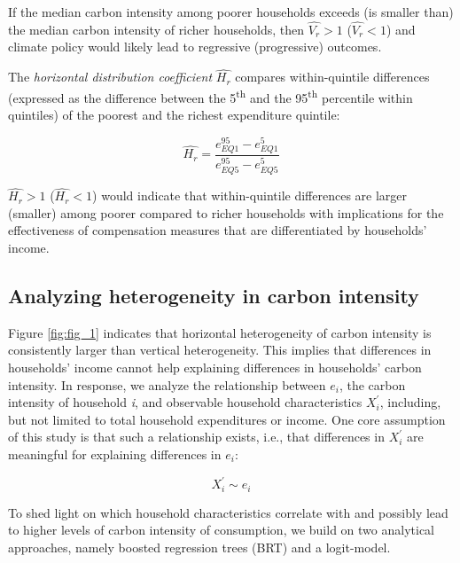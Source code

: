 \documentclass[12pt, a4paper]{article}
\begin{document}
If the median carbon intensity among poorer households exceeds (is smaller than) the median carbon intensity of richer households, then $\widehat{V_{r}}>1$ ($\widehat{V_{r}}<1$) and climate policy would likely lead to regressive (progressive) outcomes.

The \textit{horizontal distribution coefficient} $\widehat{H_{r}}$ compares within-quintile differences (expressed as the difference between the 5\textsuperscript{th} and the 95\textsuperscript{th} percentile within quintiles) of the poorest and the richest expenditure quintile:

\begin{equation}
    \widehat{H_{r}} = \frac{e_{EQ1}^{95} - e_{EQ1}^{5}}{e_{EQ5}^{95} - e_{EQ5}^{5}}
\end{equation}

$\widehat{H_{r}}>1$ ($\widehat{H_{r}}<1$) would indicate that within-quintile differences are larger (smaller) among poorer compared to richer households with implications for the effectiveness of compensation measures that are differentiated by households' income.

\subsection{Analyzing heterogeneity in carbon intensity} \label{sec:methods}

Figure \ref{fig:fig_1} indicates that horizontal heterogeneity of carbon intensity is consistently larger than vertical heterogeneity. This implies that differences in households' income cannot help explaining differences in households' carbon intensity. In response, we analyze the relationship between $e_{i}$, the carbon intensity of household \textit{i}, and observable household characteristics $X_{i}^{'}$, including, but not limited to total household expenditures or income. One core assumption of this study is that such a relationship exists, i.e., that differences in $X_{i}^{'}$ are meaningful for explaining differences in $e_{i}$:

\begin{equation} \label{eq:relationship}
    X_{i}^{'} \sim e_{i} 
\end{equation}


To shed light on which household characteristics correlate with and possibly lead to higher levels of carbon intensity of consumption, we build on two analytical approaches, namely boosted regression trees (BRT) and a logit-model.
\end{document}
